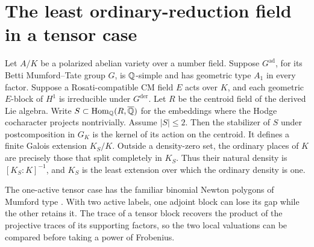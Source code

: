 \section{The least ordinary-reduction field in a tensor case}
\label{sec:original-a1}

\begin{theorem}\label{thm:original-a1}
Let \(A/K\) be a polarized abelian variety over a number field. Suppose
\(G^{\mathrm{ad}}\), for its Betti Mumford--Tate group \(G\), is
\(\mathbb Q\)-simple and has geometric type \(A_1\) in every factor. Suppose a
Rosati-compatible CM field \(E\) acts over \(K\), and each geometric
\(E\)-block of \(H^1\) is irreducible under \(G^{\mathrm{der}}\).
Let \(R\) be the centroid field of the derived Lie algebra. Write
\(S\subset\operatorname{Hom}_{\mathbb Q}(R,\overline{\mathbb Q})\) for the embeddings
where the Hodge cocharacter projects nontrivially. Assume \(|S|\le2\).
Then the stabilizer of \(S\) under postcomposition in \(G_K\) is the
kernel of its action on the centroid. It defines a finite Galois
extension \(K_S/K\). Outside a density-zero set, the
ordinary places of \(K\) are precisely those that split completely in
\(K_S\). Thus their natural density is \([K_S:K]^{-1}\), and \(K_S\)
is the least extension over which the ordinary density is one.
\end{theorem}

The one-active tensor case has the familiar binomial Newton polygons
of Mumford type \cite[\S2]{nootrealization}\cite[Theorem~1.2]{shengzuo}.
With two active labels, one adjoint block can lose its gap while the
other retains it. The trace of a tensor block recovers the product of
the projective traces of its supporting factors, so the two local
valuations can be compared before taking a power of Frobenius.

